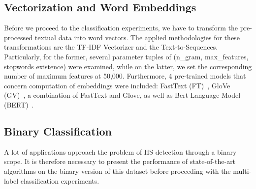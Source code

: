 \documentclass[sigconf]{acmart}
\begin{document}
\subsection{Vectorization and Word Embeddings}
Before we proceed to the classification experiments, we have to transform the pre-processed textual data into word vectors. The applied methodologies for these transformations are the TF-IDF Vectorizer and the Text-to-Sequences. Particularly, for the former, several parameter tuples of (n\_gram, max\_features, stopwords existence) were examined, while on the latter, we set the corresponding number of maximum features at 50,000. Furthermore, 4 pre-trained models that concern computation of embeddings were included: FastText (FT)~\cite{fastText}, GloVe (GV)~\cite{glove}, a combination of FastText and Glove, as well as Bert Language Model (BERT)~\cite{bert}.

\iffalse
\begin{itemize}
    \item FastText (FT)~\cite{fastText}: 2 million word vectors trained on Common Crawl with 600B tokens\footnote{\url{https://dl.fbaipublicfiles.com/fasttext/vectors-english/crawl-300d-2M.vec.zip}}
    \item GloVe (GV)~\cite{glove}: Common Crawl with 42B tokens, 1.9M vocab, uncased, 300d vectors, 1.75 GB download\footnote{\url{http://nlp.stanford.edu/data/glove.42B.300d.zip}}
    \item FastText \& GloVe concatenated
    \item Bert (BERT)~\cite{bert}: pre-trained language model ``bert\_u-ncased\_L-12\_H-768\_A-12'' trained on English Wikipedia and the BookCorpus
\end{itemize}
\fi

\subsection{Binary Classification}
A lot of applications approach the problem of HS detection through a binary scope. It is therefore necessary to present the performance of state-of-the-art algorithms on the binary version of this dataset before proceeding with the multi-label classification experiments.
\end{document}

